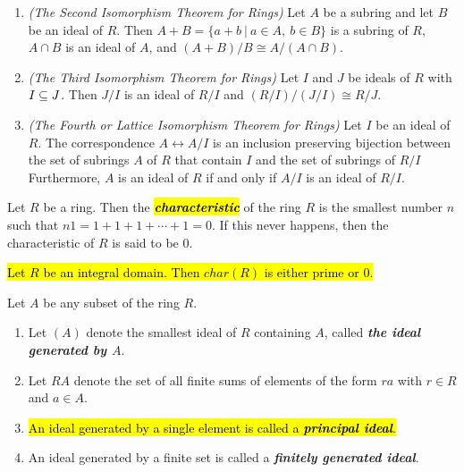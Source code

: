 \nl

\begin{thm}\nl
\begin{enumerate}
\item \textit{(The Second Isomorphism Theorem for Rings)} Let $A$ be a subring and let $B$ be an ideal of $R$. Then $A+B = \{a + b\ |\ a\in A, \ b\in B\}$ is a subring of $R$, $A\cap B$ is an ideal of $A$, and $(A+B)/B\cong A/(A\cap B)$.
\item \textit{(The Third Isomorphism Theorem for Rings)} Let $I$ and $J$ be ideals of $R$ with $I\subseteq J$. Then $J/I$ is an ideal of $R/I$ and $(R/I)/(J/I)\cong R/J$.
\item \textit{(The Fourth or Lattice Isomorphism Theorem for Rings)} Let $I$ be an ideal of $R$. The correspondence $A\leftrightarrow A/I$ is an inclusion preserving bijection between the set of subrings $A$ of $R$ that contain $I$ and the set of subrings of $R/I$ Furthermore, $A$ is an ideal of $R$ if and only if $A/I$ is an ideal of $R/I$.
\end{enumerate}
\end{thm}

\nl

\begin{defn}
Let $R$ be a ring. Then the \hl{\textit{\textbf{characteristic}}} of the ring $R$ is the smallest number $n$ such that $n1 = 1+1+1+\cdots+1 = 0$. If this never happens, then the characteristic of $R$ is said to be $0$.
\end{defn}

\nl

\begin{prop}
\hl{Let $R$ be an integral domain. Then $char(R)$ is either prime or 0.}
\end{prop}

\nl

\begin{defn}
Let $A$ be any subset of the ring $R$.
\begin{enumerate}
\item Let $(A)$ denote the smallest ideal of $R$ containing $A$, called \textbf{\textit{the ideal generated by $A$}}.
\item Let $RA$ denote the set of all finite sums of elements of the form $ra$ with $r\in R$ and $a\in A$.
\item \hl{An ideal generated by a single element is called a \textit{\textbf{principal ideal}}.}
\item An ideal generated by a finite set is called a \textbf{\textit{finitely generated ideal}}.
\end{enumerate}
\end{defn}


